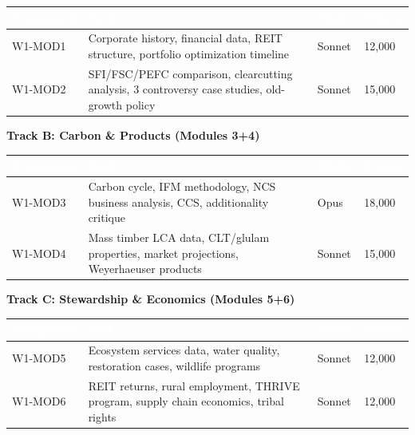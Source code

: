 \documentclass[11pt,letterpaper]{article}
\newcommand{\tableheader}[1]{\textbf{\sffamily\textcolor{white}{#1}}}
\begin{document}
\begin{center}
\begin{tabularx}{\textwidth}{L{2.5cm}XC{1.5cm}C{2cm}}
\toprule
{}
\tableheader{Component} & \tableheader{Task} & \tableheader{Model} & \tableheader{Tokens} \\
\midrule
W1-MOD1 & Corporate history, financial data, REIT structure, portfolio optimization timeline & Sonnet & 12,000 \\
W1-MOD2 & SFI/FSC/PEFC comparison, clearcutting analysis, 3 controversy case studies, old-growth policy & Sonnet & 15,000 \\
\bottomrule
\end{tabularx}
\end{center}

\textbf{Track B: Carbon \& Products (Modules 3+4)}

\begin{center}
\begin{tabularx}{\textwidth}{L{2.5cm}XC{1.5cm}C{2cm}}
\toprule
{}
\tableheader{Component} & \tableheader{Task} & \tableheader{Model} & \tableheader{Tokens} \\
\midrule
W1-MOD3 & Carbon cycle, IFM methodology, NCS business analysis, CCS, additionality critique & Opus & 18,000 \\
W1-MOD4 & Mass timber LCA data, CLT/glulam properties, market projections, Weyerhaeuser products & Sonnet & 15,000 \\
\bottomrule
\end{tabularx}
\end{center}

\textbf{Track C: Stewardship \& Economics (Modules 5+6)}

\begin{center}
\begin{tabularx}{\textwidth}{L{2.5cm}XC{1.5cm}C{2cm}}
\toprule
{}
\tableheader{Component} & \tableheader{Task} & \tableheader{Model} & \tableheader{Tokens} \\
\midrule
W1-MOD5 & Ecosystem services data, water quality, restoration cases, wildlife programs & Sonnet & 12,000 \\
W1-MOD6 & REIT returns, rural employment, THRIVE program, supply chain economics, tribal rights & Sonnet & 12,000 \\
\bottomrule
\end{tabularx}
\end{center}
\end{document}
